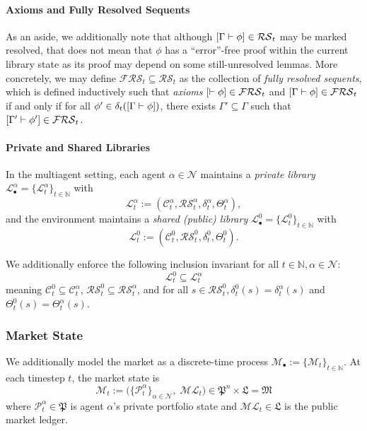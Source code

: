 \paragraph{Axioms and Fully Resolved Sequents}

As an aside, we additionally note that although $[\Gamma \vdash \phi] \in \mathcal{RS}_t$ may be marked resolved, that does not mean that $\phi$ has a ``error''-free proof within the current library state as its proof may depend on some still-unresolved lemmas. More concretely, we may define $\mathcal{FRS}_t \subseteq \mathcal{RS}_t$ as the collection of \textit{fully resolved sequents}, which is defined inductively such that \textit{axioms} $[\vdash \phi] \in \mathcal{FRS}_t$ and $[\Gamma \vdash \phi] \in \mathcal{FRS}_t$ if and only if for all $\phi' \in \delta_t([\Gamma \vdash \phi])$, there exists $\Gamma'\subseteq \Gamma$ such that $[\Gamma' \vdash \phi'] \in \mathcal{FRS}_t$.


\paragraph{Private and Shared Libraries}
In the multiagent setting, each agent $\alpha\in\mathcal{N}$ maintains a \textit{private library} $\mathcal{L}_\bullet^\alpha = \{\mathcal{L}^\alpha_t\}_{t\in\mathbb{N}}$ with
\[
\mathcal{L}^\alpha_t := (\mathcal{C}^\alpha_t,\mathcal{RS}^\alpha_t,\delta^\alpha_t,\Theta_t^\alpha),
\]
and the environment maintains a \textit{shared (public) library} $\mathcal{L}_\bullet^0 = \{\mathcal{L}^0_t\}_{t\in\mathbb{N}}$ with
\[
\mathcal{L}^0_t := (\mathcal{C}^0_t,\mathcal{RS}^0_t,\delta^0_t, \Theta_t^0).
\]

We additionally enforce the following inclusion invariant for all $t \in \mathbb{N}, \alpha \in \mathcal{N}$:
\[
\mathcal{L}^0_t \subseteq \mathcal{L}^\alpha_t
\]
meaning $\mathcal{C}^0_t\subseteq \mathcal{C}^\alpha_t$, $\mathcal{RS}^0_t\subseteq \mathcal{RS}^\alpha_t$, and for all $s\in \mathcal{RS}_t^0, \delta^0_t(s) = \delta^\alpha_t(s)$ and $\Theta^0_t(s)=\Theta^\alpha_t(s)$.


\subsubsection{Market State}

We additionally model the market as a discrete-time process $\mathcal{M}_\bullet := \{\mathcal{M}_t\}_{t\in\mathbb{N}}$.
At each timestep $t$, the market state is
\[
\mathcal{M}_t := \big(\{\mathcal{P}^\alpha_t\}_{\alpha\in\mathcal{N}},\;\mathcal{ML}_t\big)
\in \mathfrak{P}^n \times \mathfrak{L} = \mathfrak{M}\]
where $\mathcal{P}^\alpha_t\in\mathfrak{P}$ is agent $\alpha$'s private portfolio state and $\mathcal{ML}_t \in \mathfrak{L}$
is the public market ledger.

